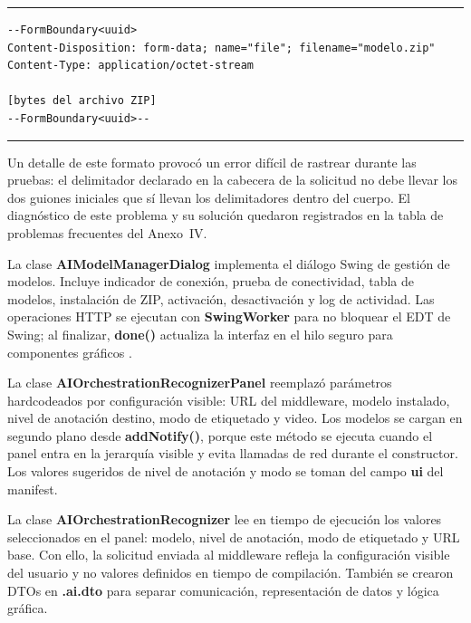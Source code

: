 \begin{center}
\begin{minipage}{0.82\textwidth}
\hrule
\vspace{0.12cm}
\small
\begin{Verbatim}[baselinestretch=0.82]
--FormBoundary<uuid>
Content-Disposition: form-data; name="file"; filename="modelo.zip"
Content-Type: application/octet-stream

[bytes del archivo ZIP]
--FormBoundary<uuid>--
\end{Verbatim}
\vspace{0.05cm}
\hrule

\label{lst:multipart_install_model}
\end{minipage}
\end{center}

Un detalle de este formato provocó un error difícil de rastrear durante las pruebas: el delimitador declarado en la cabecera de la solicitud no debe llevar los dos guiones iniciales que sí llevan los delimitadores dentro del cuerpo. El diagnóstico de este problema y su solución quedaron registrados en la tabla de problemas frecuentes del Anexo~IV.

La clase \textbf{AIModel\allowbreak{}ManagerDialog} implementa el diálogo Swing de gestión de modelos. Incluye indicador de conexión, prueba de conectividad, tabla de modelos, instalación de ZIP, activación, desactivación y log de actividad. Las operaciones HTTP se ejecutan con \textbf{SwingWorker} para no bloquear el EDT de Swing; al finalizar, \textbf{done()} actualiza la interfaz en el hilo seguro para componentes gráficos \cite{java_swingworker}.

La clase \textbf{AIOrchestration\allowbreak{}RecognizerPanel} reemplazó parámetros hardcodeados por configuración visible: URL del middleware, modelo instalado, nivel de anotación destino, modo de etiquetado y video. Los modelos se cargan en segundo plano desde \textbf{addNotify()}, porque este método se ejecuta cuando el panel entra en la jerarquía visible y evita llamadas de red durante el constructor. Los valores sugeridos de nivel de anotación y modo se toman del campo \textbf{ui} del manifest.

La clase \textbf{AIOrchestration\allowbreak{}Recognizer} lee en tiempo de ejecución los valores seleccionados en el panel: modelo, nivel de anotación, modo de etiquetado y URL base. Con ello, la solicitud enviada al middleware refleja la configuración visible del usuario y no valores definidos en tiempo de compilación. También se crearon DTOs en \textbf{.ai.dto} para separar comunicación, representación de datos y lógica gráfica.

